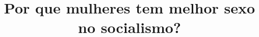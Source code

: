 \documentclass{novel}
\title     {Por que mulheres tem melhor sexo no socialismo?}
\subtitle  {}
\begin{document}
\toc

\end{document}
